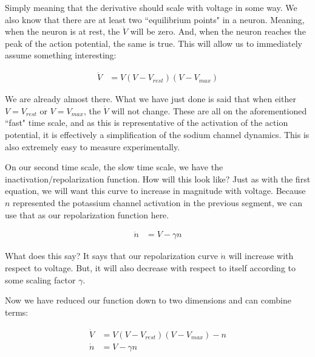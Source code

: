\documentclass[12pt]{report}
\begin{document}
Simply meaning that the derivative should scale with voltage in some way. We also know that there are at least two ``equilibrium points" in a neuron. Meaning, when the neuron is at rest, the $\dot{V}$ will be zero. And, when the neuron reaches the peak of the action potential, the same is true. This will allow us to immediately assume something interesting:

\begin{equation} \label{fn2}
\begin{split}
\dot{V} &= V(V - V_{rest})(V - V_{max})
\end{split}
\end{equation}

We are already almost there. What we have just done is said that when either $V = V_{rest}$ or $V = V_{max}$, the $\dot{V}$ will not change. These are all on the aforementioned ``fast" time scale, and as this is representative of the activation of the action potential, it is effectively a simplification of the sodium channel dynamics. This is also extremely easy to measure experimentally.\newline

On our second time scale, the slow time scale, we have the inactivation/repolarization function. How will this look like? Just as with the first equation, we will want this curve to increase in magnitude with voltage. Because $n$ represented the potassium channel activation in the previous segment, we can use that as our repolarization function here. 

\begin{equation} \label{fn3}
\begin{split}
\dot{n} &= V - \gamma n
\end{split}
\end{equation}

What does this say? It says that our repolarization curve $\dot{n}$ will increase with respect to voltage. But, it will also decrease with respect to itself according to some scaling factor $\gamma$.\newline

Now we have reduced our function down to two dimensions and can combine terms: 
    
\begin{equation} \label{fn4}
\begin{split}
    \dot{V} &= V(V - V_{rest})(V - V_{max}) - n\\ 
    \dot{n} &= V - \gamma n\\
\end{split}
\end{equation}
\end{document}
